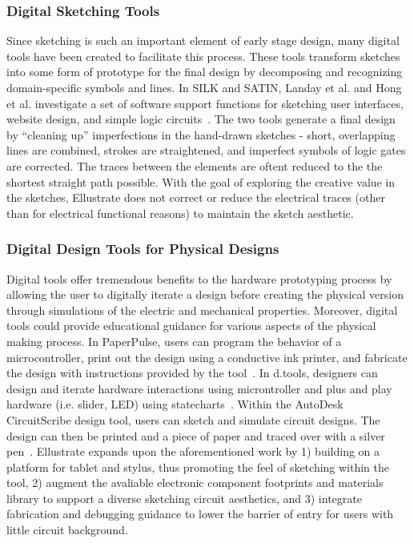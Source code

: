 \documentclass{sigchi}
\begin{document}
\subsubsection{Digital Sketching Tools} 
Since sketching is such an important element of early stage design, many digital tools have been created to facilitate this process. These tools transform sketches into some form of prototype for the final design by decomposing and recognizing domain-specific symbols and lines. In SILK and SATIN, Landay et al. and Hong et al. investigate a set of software support functions for sketching user interfaces, website design, and simple logic circuits~\cite{Hong:2007ta,Landay:1996wn}. The two tools generate a final design by ``cleaning up'' imperfections in the hand-drawn sketches - short, overlapping lines are combined, strokes are straightened, and imperfect symbols of logic gates are corrected. The traces between the elements are oftent reduced to the the shortest straight path possible. With the goal of exploring the creative value in the sketches, Ellustrate does not correct or reduce the electrical traces (other than for electrical functional reasons) to maintain the sketch aesthetic. 


\subsubsection{Digital Design Tools for Physical Designs}
Digital tools offer tremendous benefits to the hardware prototyping process by allowing the user to digitally iterate a design before creating the physical version through simulations of the electric and mechanical properties. Moreover, digital tools could provide educational guidance for various aspects of the physical making process. In PaperPulse, users can program the behavior of a microcontroller, print out the design using a conductive ink printer, and fabricate the design with instructions provided by the tool~\cite{RafRamakers:2015gb}. In d.tools, designers can design and iterate hardware interactions using microntroller and plus and play hardware (i.e. slider, LED) using statecharts~\cite{hartmann_reflective_2006}. Within the AutoDesk CircuitScribe design tool, users can sketch and simulate circuit designs. The design can then be printed and a piece of paper and traced over with a silver pen~\cite{_autodesk_????}. Ellustrate expands upon the aforementioned work by 1) building on a platform for tablet and stylus, thus promoting the feel of sketching within the tool, 2) augment the avaliable electronic component footprints and materials library to support a diverse sketching circuit aesthetics, and 3) integrate fabrication and debugging guidance to lower the barrier of entry for users with little circuit background.
\end{document}
